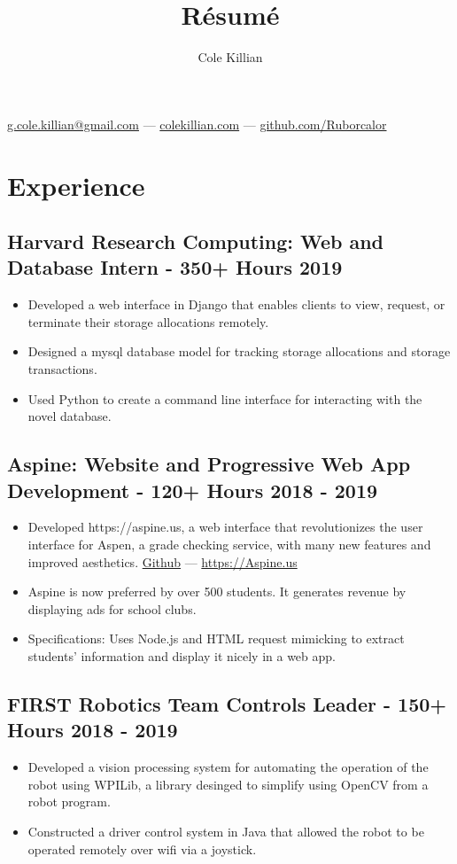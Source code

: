 \documentclass{article}
\makeatletter
\renewcommand{\maketitle}{
\begin{center}
{\color{green}\huge\bfseries
\theauthor}

\vspace{.25em}
\href{mailto:g.cole.killian@gmail.com}{g.cole.killian@gmail.com} --- \href{https://colekillian.com}{colekillian.com} --- \href{https://github.com/Ruborcalor}{github.com/Ruborcalor} 
\end{center}
}
\makeatother
\begin{document}
\title{R\'esum\'e}
\author{Cole Killian}

\maketitle

\section{Experience}

\subsection{Harvard Research Computing: Web and Database Intern - 350+ Hours \hfill 2019}
\begin{itemize}[leftmargin=0.5in]
  \setlength\itemsep{0.00em}
  \item Developed a web interface in Django that enables clients to view, request, or terminate their storage allocations remotely.
  \item Designed a mysql database model for tracking storage allocations and storage transactions.
  \item Used Python to create a command line interface for interacting with the novel database.
\end{itemize}

\subsection{Aspine: Website and Progressive Web App Development - 120+ Hours \hfill 2018 - 2019}
\begin{itemize}[leftmargin=0.5in]
  \setlength\itemsep{0.00em}
  \item Developed https://aspine.us, a web interface that revolutionizes the user interface for Aspen, a grade checking service, with many new features and improved aesthetics. \href{https://github.com/maxtkc/aspine}{Github} --- \href{https://aspine.us}{https://Aspine.us}
  \item Aspine is now preferred by over 500 students. It generates revenue by displaying ads for school clubs.
  \item Specifications: Uses Node.js and HTML request mimicking to extract students’ information and display it nicely in a web app.
\end{itemize}

\subsection{FIRST Robotics Team Controls Leader - 150+ Hours \hfill 2018 - 2019}
\begin{itemize}[leftmargin=0.5in]
  \setlength\itemsep{0.00em}
  \item Developed a vision processing system for automating the operation of the robot using WPILib, a library desinged to simplify using OpenCV from a robot program.
  \item Constructed a driver control system in Java that allowed the robot to be operated remotely over wifi via a joystick.
\end{itemize}
\end{document}

